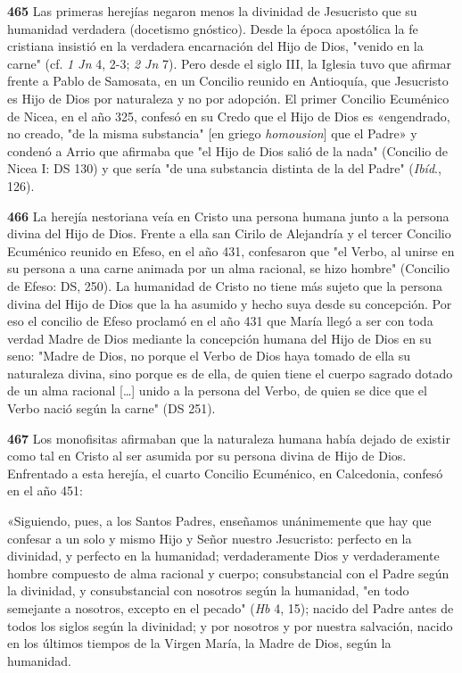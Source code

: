 \documentclass[]{article}
\begin{document}
\textbf{465} Las primeras herejías negaron menos la divinidad de
Jesucristo que su humanidad verdadera (docetismo gnóstico). Desde la
época apostólica la fe cristiana insistió en la verdadera encarnación
del Hijo de Dios, "venido en la carne" (cf. \emph{1 Jn} 4, 2-3; \emph{2
Jn} 7). Pero desde el siglo III, la Iglesia tuvo que afirmar frente a
Pablo de Samosata, en un Concilio reunido en Antioquía, que Jesucristo
es Hijo de Dios por naturaleza y no por adopción. El primer Concilio
Ecuménico de Nicea, en el año 325, confesó en su Credo que el Hijo de
Dios es «engendrado, no creado, "de la misma substancia" {[}en griego
\emph{homousion}{]} que el Padre» y condenó a Arrio que afirmaba que "el
Hijo de Dios salió de la nada" (Concilio de Nicea I: DS 130) y que sería
"de una substancia distinta de la del Padre" (\emph{Ibíd}., 126).

\textbf{466} La herejía nestoriana veía en Cristo una persona humana
junto a la persona divina del Hijo de Dios. Frente a ella san Cirilo de
Alejandría y el tercer Concilio Ecuménico reunido en Efeso, en el año
431, confesaron que "el Verbo, al unirse en su persona a una carne
animada por un alma racional, se hizo hombre" (Concilio de Efeso: DS,
250). La humanidad de Cristo no tiene más sujeto que la persona divina
del Hijo de Dios que la ha asumido y hecho suya desde su concepción. Por
eso el concilio de Efeso proclamó en el año 431 que María llegó a ser
con toda verdad Madre de Dios mediante la concepción humana del Hijo de
Dios en su seno: "Madre de Dios, no porque el Verbo de Dios haya tomado
de ella su naturaleza divina, sino porque es de ella, de quien tiene el
cuerpo sagrado dotado de un alma racional [\ldots{}] unido a la persona
del Verbo, de quien se dice que el Verbo nació según la carne" (DS 251).

\textbf{467} Los monofisitas afirmaban que la naturaleza humana había
dejado de existir como tal en Cristo al ser asumida por su persona
divina de Hijo de Dios. Enfrentado a esta herejía, el cuarto Concilio
Ecuménico, en Calcedonia, confesó en el año 451:

«Siguiendo, pues, a los Santos Padres, enseñamos unánimemente que hay
que confesar a un solo y mismo Hijo y Señor nuestro Jesucristo: perfecto
en la divinidad, y perfecto en la humanidad; verdaderamente Dios y
verdaderamente hombre compuesto de alma racional y cuerpo;
consubstancial con el Padre según la divinidad, y consubstancial con
nosotros según la humanidad, "en todo semejante a nosotros, excepto en
el pecado" (\emph{Hb} 4, 15); nacido del Padre antes de todos los siglos
según la divinidad; y por nosotros y por nuestra salvación, nacido en
los últimos tiempos de la Virgen María, la Madre de Dios, según la
humanidad.
\end{document}
